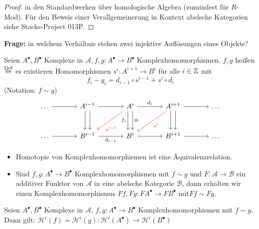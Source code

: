 \begin{proof}
	in den Standardwerken über homologische Algebra (zumindest für $R$-Mod). Für den Beweis einer Verallgemeinerung in Kontext abelsche Kategorien siehe Stacks-Project 013P.
\end{proof}
\textbf{Frage:} in welchem Verhältnis stehen zwei injektive Auflösungen eines Objekts? 
\begin{df}\label{7.10}
	Seien $A^{\bullet}, B^{\bullet} $ Komplexe in $\mathcal{A}, f,g: A^{\bullet} \to B^{\bullet} $ Komplexhomomorphismen. $f,g $ heißen  $\overset{\text{Def}}{\Leftrightarrow} $ es existieren Homomorphismen $ s^{i}: A^{i+1} \to B^i $ für alle $i \in \mathbb{Z} $ mit $$ f_i  -g_i = d_{i-1} \circ s^{i-1} + s^i \circ d_i $$
	(Notation: $f \sim g$)
	$$\begin{tikzcd}[column sep = large, row sep = large]
	\ldots \arrow{r} & A^{i-1}\arrow[xshift = -0.8 ex, swap]{d} \arrow[xshift = 0.8 ex]{d} \arrow{r}& A^i \arrow[red, near end]{dl}{s^{i-1}} \arrow[xshift = -0.8 ex, swap]{d}{f_i} \arrow[xshift = 0.8ex]{d}{g_i} \arrow{r}{d_i} & A^{i+1} \arrow[red]{dl}{s^i} \arrow[xshift = -0.8 ex, swap]{d} \arrow[xshift = 0.8 ex]{d}\arrow{r} & \ldots\\
	\ldots \arrow{r} & B^{i-1} \arrow[swap]{r}{d_{i-1}} & B^i \arrow[swap]{r} & B^{i+1} \arrow{r} & \ldots
	\end{tikzcd}$$
\end{df}
\begin{anm}
	\begin{itemize}
		\item Homotopie von Komplexhomomorphismen ist eine Äquivalenzrelation.
		\item Sind $f,g: A^{\bullet} \to B^{\bullet} $ Komplexhomomorphismen mit $ f \sim g $ und $F: \mathcal{A} \to \mathcal{B} $ ein additiver Funktor von $\mathcal{A} $ in eine abelsche Kategorie $\mathcal{B} $, dann erhalten wir einen Komplexhomomorphismus $ Ff, Fg: FA^{\bullet} \to FB^{\bullet} $ mit$ Ff \sim Fg$.
	\end{itemize}
\end{anm}
\begin{bem}\label{7.8}
	Seien $A^{\bullet}, B^{\bullet} $ Komplexe in $\mathcal{A},\,  f,g: A^{\bullet} \to B^{\bullet} $ Komplexhomomorphismen mit $ f\sim g $. Dann gilt: $ \mathcal{H}^i(f) = \mathcal{H}^i(g): \mathcal{H}^i(A^{\bullet}) \to \mathcal{H}^i(B^{\bullet}) $
\end{bem}

